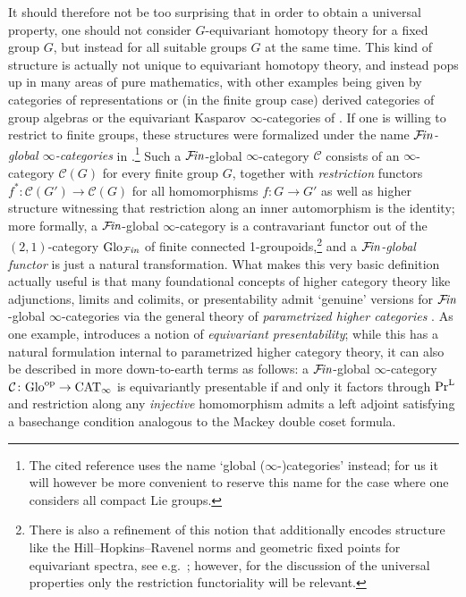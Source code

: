 \documentclass[reqno]{memo-l}
\theoremstyle{mythm}
\theoremstyle{definition}
\numberwithin{equation}{section}
\newcommand{\Cc}{{\mathcal{C}}}
\newcommand{\Ff}{{\mathcal{F}}}
\DeclareMathOperator{\CAT}{CAT}
\newcommand{\PrL}{\textup{Pr}^{\textup{L}}}
\newcommand{\op}{{\textup{op}}}
\newcommand{\Fin}{\hbox{$\mathcal F\kern-1.7pt\textit{in}$}}
\newcommand{\Glo}{\textup{Glo}}
\begin{document}
It should therefore not be too surprising that in order to obtain a universal property, one should not consider $G$-equivariant homotopy theory for a fixed group $G$, but instead for all suitable groups $G$ at the same time. This kind of structure is actually not unique to equivariant homotopy theory, and instead pops up in many areas of pure mathematics, with other examples being given by categories of representations or (in the finite group case) derived categories of group algebras or the equivariant Kasparov $\infty$-categories of \cite{BEL2023Kasparov}.
If one is willing to restrict to finite groups, these structures were formalized under the name \emph{$\Fin$-global $\infty$-categories} in \cite{CLL_Global}.\footnote{The cited reference uses the name `global ($\infty$-)categories' instead; for us it will however be more convenient to reserve this name for the case where one considers all compact Lie groups.} Such a $\Fin$-global $\infty$-category $\Cc$ consists of an $\infty$-category $\Cc(G)$ for every finite group $G$, together with \emph{restriction} functors $f^*\colon\Cc(G')\to\Cc(G)$ for all homomorphisms $f\colon G\to G'$ as well as higher structure witnessing that restriction along an inner automorphism is the identity; more formally, a $\Fin$-global $\infty$-category is a contravariant functor out of the $(2,1)$-category $\Glo_{\Ff\kern-.4pt\textit{in}}$ of finite connected 1-groupoids,\footnote{There is also a refinement of this notion that additionally encodes structure like the Hill--Hopkins--Ravenel norms and geometric fixed points for equivariant spectra, see e.g.\ \cite{LLP}; however, for the discussion of the universal properties only the restriction functoriality will be relevant.} and a \emph{$\Fin$-global functor} is just a natural transformation. What makes this very basic definition actually useful is that many foundational concepts of higher category theory like adjunctions, limits and colimits, or presentability admit `genuine' versions for $\Fin$-global $\infty$-categories via the general theory of \emph{parametrized higher categories} \cites{exposeI,martiniwolf2021limits}. As one example, \cite{CLL_Clefts} introduces a notion of \emph{equivariant presentability}; while this has a natural formulation internal to parametrized higher category theory, it can also be described in more down-to-earth terms as follows: a $\Fin$-global $\infty$-category $\Cc\colon\Glo^\op\to\CAT_\infty$ is equivariantly presentable if and only it factors through $\PrL$ and restriction along any \emph{injective} homomorphism admits a left adjoint satisfying a basechange condition analogous to the Mackey double coset formula. 
\end{document}
